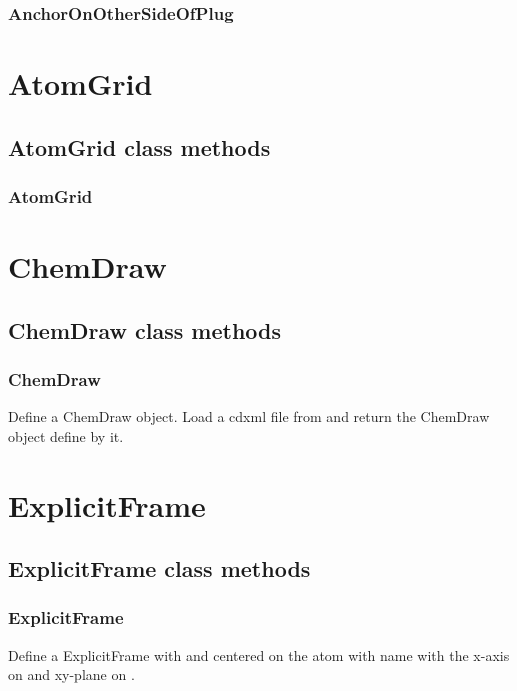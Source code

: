 \begin{itemize}
\subsubsection{AnchorOnOtherSideOfPlug}

\section{AtomGrid}
\subsection{AtomGrid class methods}
\subsubsection{AtomGrid}

\section{ChemDraw}
\subsection{ChemDraw class methods}
\subsubsection{ChemDraw}

Define a ChemDraw object.  Load a cdxml file from  and return the ChemDraw object define by it.

\section{ExplicitFrame}
\subsection{ExplicitFrame class methods}
\subsubsection{ExplicitFrame}

Define a ExplicitFrame with  and centered on the atom with name 
with the x-axis on  and xy-plane on .



\end{itemize}
